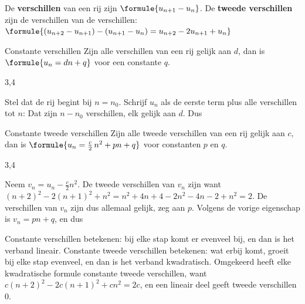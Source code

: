\begin{theorie}
De \textbf{\textcolor{accent}{verschillen}} van een rij zijn $\formule{u_{n+1} - u_n}$. De \textbf{\textcolor{accent}{tweede verschillen}} zijn de verschillen van de verschillen: \quad $\formule{(u_{n+2} - u_{n+1}) - (u_{n+1} - u_n) = u_{n+2} - 2u_{n+1} + u_n}$

\begin{stelling}{Constante verschillen}
Zijn alle verschillen van een rij gelijk aan $d$, dan is \quad $\formule{u_n = dn + q}$ \quad voor een constante $q$.
\end{stelling}

\begin{alleenvoor}{3,4}
\begin{bewijs}
Stel dat de rij begint bij $n = n_0$. Schrijf $u_n$ als de eerste term plus alle verschillen tot $n$:
Dat zijn $n - n_0$ verschillen, elk gelijk aan $d$. Dus
\end{bewijs}
\end{alleenvoor}

\begin{stelling}{Constante tweede verschillen}
Zijn alle tweede verschillen van een rij gelijk aan $c$, dan is \quad $\formule{u_n = \tfrac{c}{2}\,n^2 + pn + q}$ \quad voor constanten $p$ en $q$.
\end{stelling}

\begin{alleenvoor}{3,4}
\begin{bewijs}
Neem $v_n = u_n - \frac{c}{2}n^2$. De tweede verschillen van $v_n$ zijn
want $(n + 2)^2 - 2(n + 1)^2 + n^2 = n^2 + 4n + 4 - 2n^2 - 4n - 2 + n^2 = 2$. De verschillen van $v_n$ zijn dus allemaal gelijk, zeg aan $p$. Volgens de vorige eigenschap is $v_n = pn + q$, en dus
\end{bewijs}
\end{alleenvoor}
\end{theorie}

Constante verschillen betekenen: bij elke stap komt er evenveel bij, en dan is het verband lineair. Constante tweede verschillen betekenen: wat erbij komt, groeit bij elke stap evenveel, en dan is het verband kwadratisch. Omgekeerd heeft elke kwadratische formule constante tweede verschillen, want $c(n + 2)^2 - 2c(n + 1)^2 + cn^2 = 2c$, en een lineair deel geeft tweede verschillen $0$.

